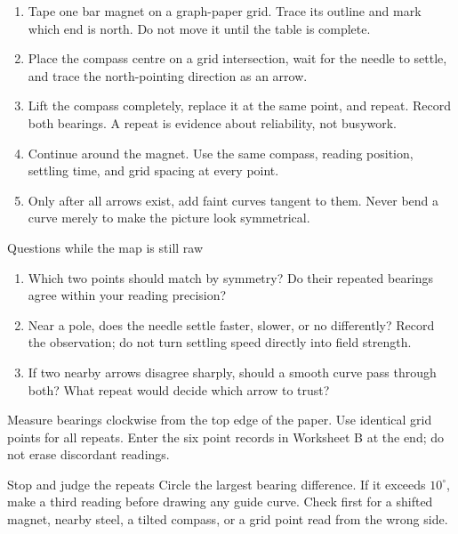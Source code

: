 \newpage
{}
\small
{}
\begin{enumerate}
\item Tape one bar magnet on a graph-paper grid. Trace its outline and mark
which end is north. Do not move it until the table is complete.
\item Place the compass centre on a grid intersection, wait for the needle to
settle, and trace the north-pointing direction as an arrow.
\item Lift the compass completely, replace it at the same point, and repeat.
Record both bearings. A repeat is evidence about reliability, not busywork.
\item Continue around the magnet. Use the same compass, reading position,
settling time, and grid spacing at every point.
\item Only after all arrows exist, add faint curves tangent to them. Never bend
a curve merely to make the picture look symmetrical.
\end{enumerate}

\compasswalk

\begin{teloscard}{Questions while the map is still raw}
\begin{enumerate}
\item Which two points should match by symmetry? Do their repeated bearings
agree within your reading precision?
\item Near a pole, does the needle settle faster, slower, or no differently?
Record the observation; do not turn settling speed directly into field strength.
\item If two nearby arrows disagree sharply, should a smooth curve pass through
both? What repeat would decide which arrow to trust?
\end{enumerate}
\end{teloscard}

Measure bearings clockwise from the top edge of the paper. Use identical grid
points for all repeats. Enter the six point records in Worksheet B at the end;
do not erase discordant readings.

\begin{telospanel}{Stop and judge the repeats}
Circle the largest bearing difference. If it exceeds \(10^\circ\), make a third
reading before drawing any guide curve. Check first for a shifted magnet,
nearby steel, a tilted compass, or a grid point read from the wrong side.
\end{telospanel}

